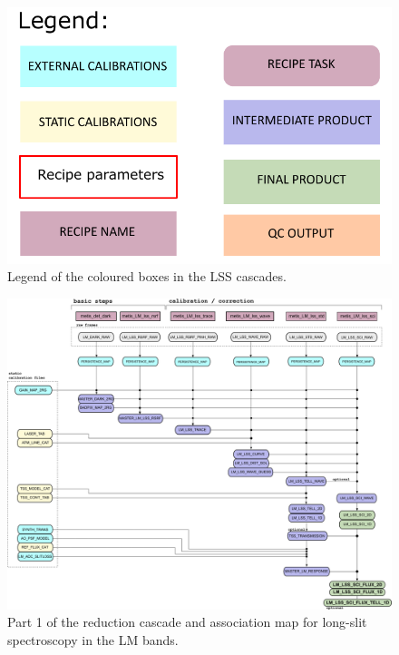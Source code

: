 \begin{figure}[ht]
  \centering
  \includegraphics[width=0.4\textheight]{figures/legend.pdf}
  \caption[Legend]{Legend of the coloured boxes in the \ac{LSS} cascades.}
  \label{Fig:LSScascadelegend}
\end{figure}
\clearpage

\begin{figure}
  \centering
  \includegraphics[width=0.9\textheight]{figures/LM_LSS_pipeline_wf_draft_latest_part_1_v0.80.png}
  \caption[Reduction cascade and association map for LM long-slit
  spectroscopy]{Part 1 of the reduction cascade and association map for long-slit
    spectroscopy in the LM bands.  }
  \label{Fig:LMLssAssomap1}
\end{figure}

